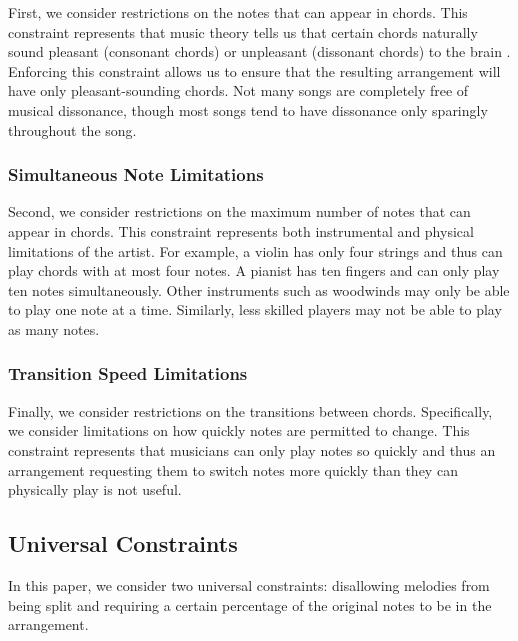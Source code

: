 \documentclass[11pt,letterpaper]{article}
\begin{document}
First, we consider restrictions on the notes that can appear in chords. This constraint represents that music theory tells us that certain chords naturally sound pleasant (consonant chords) or unpleasant (dissonant chords) to the brain \cite{Cousineau27112012}. Enforcing this constraint allows us to ensure that the resulting arrangement will have only pleasant-sounding chords. Not many songs are completely free of musical dissonance, though most songs tend to have dissonance only sparingly throughout the song.

\subsubsection{Simultaneous Note Limitations}

Second, we consider restrictions on the maximum number of notes that can appear in chords. This constraint represents both instrumental and physical limitations of the artist. For example, a violin has only four strings and thus can play chords with at most four notes. A pianist has ten fingers and can only play ten notes simultaneously. Other instruments such as woodwinds may only be able to play one note at a time. Similarly, less skilled players may not be able to play as many notes.

\subsubsection{Transition Speed Limitations}

Finally, we consider restrictions on the transitions between chords. Specifically, we consider limitations on how quickly notes are permitted to change. This constraint represents that musicians can only play notes so quickly and thus an arrangement requesting them to switch notes more quickly than they can physically play is not useful.

\subsection{Universal Constraints}
In this paper, we consider two universal constraints: disallowing melodies from being split and requiring a certain percentage of the original notes to be in the arrangement.
\end{document}
